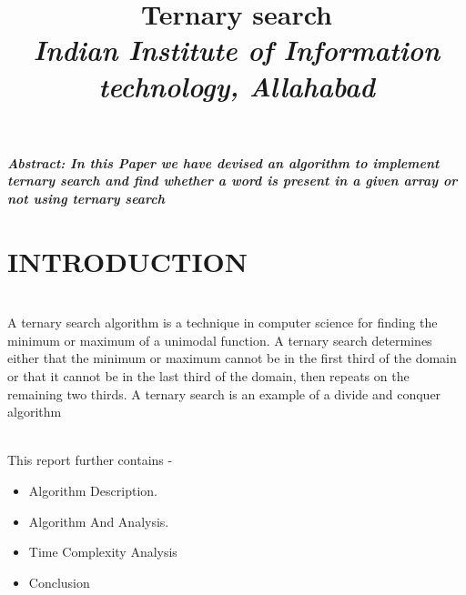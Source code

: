 \documentclass[conference]{IEEEtran}
\begin{document}
\title{Ternary search
 \\
\textit{\Large{Indian Institute of Information technology, Allahabad }}\\
}
\author{
\and
{}
\and
{}
}

\maketitle
{\textbf{\textit{Abstract: In this Paper we have devised an algorithm to implement ternary search and  find whether a word is present in a given array or not using ternary search
\\ }}}
\maketitle

\section{INTRODUCTION}\\
A ternary search algorithm is a technique in computer science for finding the minimum or maximum of a unimodal function. A ternary search determines either that the minimum or maximum cannot be in the first third of the domain or that it cannot be in the last third of the domain, then repeats on the remaining two thirds. A ternary search is an example of a divide and conquer algorithm

\\ This report further contains - 
\begin{itemize}
    \item Algorithm Description.
    \item Algorithm And  Analysis.
    \item Time Complexity Analysis 
    \item Conclusion\
\end{itemize}
\end{document}
